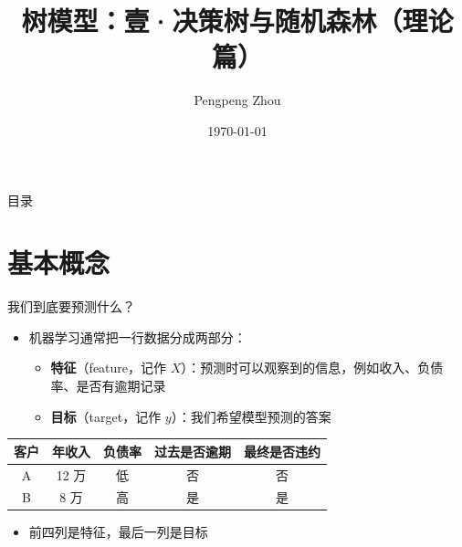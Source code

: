 \documentclass[10pt,aspectratio=43]{beamer}
\title[树模型：壹·决策树与随机森林（理论篇）]{树模型：壹·决策树与随机森林（理论篇）}
\author[Pengpeng Zhou]{Pengpeng Zhou}
\institute[北京工商大学]{北京工商大学\quad 经济学院\\ m3126211047@163.com}
\date{\today}
\begin{document}
\begin{frame}[plain]
  \titlepage
\end{frame}

\begin{frame}[plain]{目录}
  \tableofcontents
\end{frame}

\section{基本概念}

\begin{frame}{我们到底要预测什么？}
  \begin{itemize}
    \item 机器学习通常把一行数据分成两部分：
      \begin{itemize}
        \item \textbf{特征}（feature，记作 $X$）：预测时可以观察到的信息，例如收入、负债率、是否有逾期记录
        \item \textbf{目标}（target，记作 $y$）：我们希望模型预测的答案
      \end{itemize}
  \end{itemize}
  \vspace{-1ex}
  \begin{center}
  \begin{tabular}{ccccc}
    \toprule
    客户 & 年收入 & 负债率 & 过去是否逾期 & 最终是否违约 \\
    \midrule
    A & 12 万 & 低 & 否 & 否 \\
    B & 8 万 & 高 & 是 & 是 \\
    \bottomrule
  \end{tabular}
  \end{center}
  \begin{itemize}
    \item 前四列是特征，最后一列是目标
  \end{itemize}
\end{frame}
\end{document}
